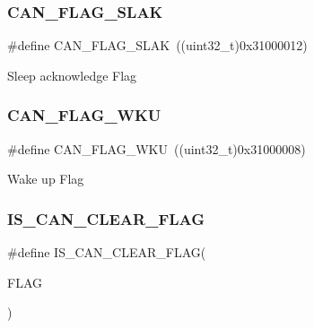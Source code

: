 \subsubsection{\texorpdfstring{CAN\_FLAG\_SLAK}{CAN\_FLAG\_SLAK}}
{\footnotesize\ttfamily \#define C\+A\+N\+\_\+\+F\+L\+A\+G\+\_\+\+S\+L\+AK~((uint32\+\_\+t)0x31000012)}

Sleep acknowledge Flag \mbox{\label{group___c_a_n__flags_ga18c72dbe75cb80e8b5126c23c9120818}} 
\subsubsection{\texorpdfstring{CAN\_FLAG\_WKU}{CAN\_FLAG\_WKU}}
{\footnotesize\ttfamily \#define C\+A\+N\+\_\+\+F\+L\+A\+G\+\_\+\+W\+KU~((uint32\+\_\+t)0x31000008)}

Wake up Flag \mbox{\label{group___c_a_n__flags_gac46f5fb953efb6163cf3b2e33a514d0c}} 
\subsubsection{\texorpdfstring{IS\_CAN\_CLEAR\_FLAG}{IS\_CAN\_CLEAR\_FLAG}}
{\footnotesize\ttfamily \#define I\+S\+\_\+\+C\+A\+N\+\_\+\+C\+L\+E\+A\+R\+\_\+\+F\+L\+AG(\begin{DoxyParamCaption}\item[{}]{F\+L\+AG }\end{DoxyParamCaption})}

